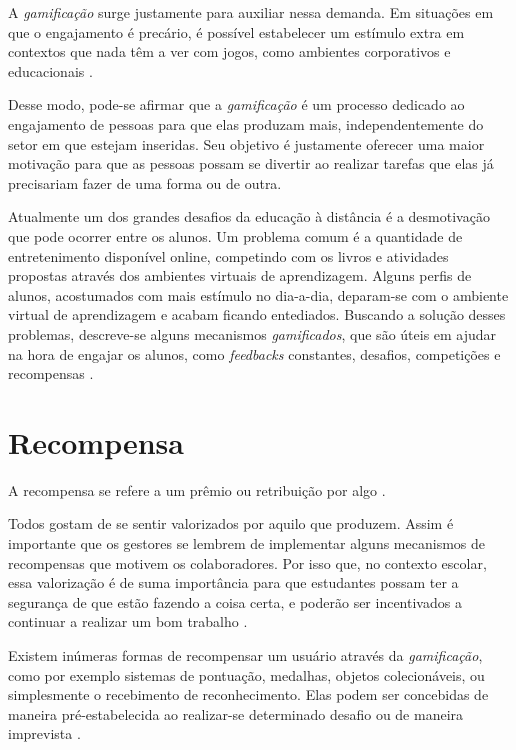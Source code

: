 A \textit{gamificação} surge justamente para auxiliar nessa demanda. Em situações em que o engajamento é precário, é possível estabelecer um estímulo extra em contextos que nada têm a ver com jogos, como ambientes corporativos e educacionais
\cite{gamificacao-corporativa:2017}.


Desse modo, pode-se afirmar que a \textit{gamificação} é um processo dedicado ao engajamento de pessoas para que elas produzam mais, independentemente do setor em que estejam inseridas. Seu objetivo é justamente oferecer uma maior motivação para que as pessoas possam se divertir ao realizar tarefas que elas já precisariam fazer de uma forma ou de outra. \cite{gamificacao-corporativa:2017}

Atualmente um dos grandes desafios da educação à distância é a desmotivação que pode ocorrer entre os alunos. Um problema comum é a quantidade de entretenimento disponível online, competindo com os livros e atividades propostas através dos ambientes virtuais de aprendizagem. Alguns perfis de alunos, acostumados com mais estímulo no dia-a-dia, deparam-se com o ambiente virtual de aprendizagem e acabam ficando entediados. Buscando a solução desses problemas, descreve-se alguns mecanismos \textit{gamificados}, que são úteis em ajudar na hora de engajar os alunos, como \textit{\glspl{feedback}} constantes, desafios, competições e recompensas \cite{gamificação-na-ead:2014}.

\section{Recompensa}
A recompensa se refere a um prêmio ou retribuição por algo \cite{dicio-recompensa:2009}.


Todos gostam de se sentir valorizados por aquilo que produzem. Assim é importante que os gestores se lembrem de implementar alguns mecanismos de recompensas que motivem os colaboradores. Por isso que, no contexto escolar, essa valorização é de suma importância para que estudantes possam ter a segurança de que estão fazendo a coisa certa, e poderão ser incentivados a continuar a realizar um bom trabalho \cite{gamificacao-corporativa:2017}.

Existem inúmeras formas de recompensar um usuário através da \textit{gamificação}, como por exemplo sistemas de pontuação, medalhas, objetos colecionáveis, ou simplesmente o recebimento de reconhecimento. Elas podem ser concebidas de maneira pré-estabelecida ao realizar-se determinado desafio ou de maneira imprevista \cite{gamificação-na-ead:2014}.


